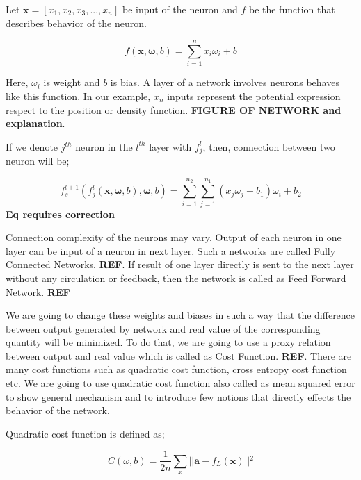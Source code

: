 \documentclass[a4paper,times,12pt]{article}
\begin{document}
Let $\boldsymbol{x} = [x_1, x_2, x_3, ..., x_n]$ be input of the neuron and $f$ be the function that describes behavior of the neuron. 

\begin{equation}
\label{eq:NU_neuron}
f(\boldsymbol{x}, \boldsymbol{\omega}, b) = \sum\limits_{i = 1}^n x_i\omega_i + b
\end{equation}

Here, $\omega_i$ is weight and $b$ is bias. A layer of a network involves neurons behaves like this function. In our example, $x_n$ inputs represent the potential expression respect to the position or density function. \textbf{FIGURE OF NETWORK and explanation}. 

If we denote $j^{th}$ neuron in the $l^{th}$ layer with $f_j^l$, then, connection between two neuron will be;

\begin{equation}
\label{eq:NU_neuron_connection}
f_s^{l+1}(f_j^{l}(\boldsymbol{x}, \boldsymbol{\omega}, b), \boldsymbol{\omega}, b) = \sum\limits_{i=1}^{n_2} \sum\limits_{j=1}^{n_1} (x_j\omega_j + b_1)\omega_i + b_2
\end{equation}
\textbf{Eq requires correction}

Connection complexity of the neurons may vary. Output of each neuron in one layer can be input of a neuron in next layer. Such a networks are called Fully Connected Networks. \textbf{REF}. If result of one layer directly is sent to the next layer without any circulation or feedback, then the network is called as Feed Forward Network. \textbf{REF}

We are going to change these weights and biases in such a way that the difference between output generated by network and real value of the corresponding quantity will be minimized. To do that, we are going to use a proxy relation between output and real value which is called as Cost Function. \textbf{REF}. There are many cost functions such as quadratic cost function, cross entropy cost function etc. We are going to use quadratic cost function also called as mean squared error to show general mechanism and to introduce few notions that directly effects the behavior of the network. 

Quadratic cost function is defined as;

\begin{equation}
\label{eq:NT_Quadratic}
C(\omega, b) = \frac{1}{2n} \sum\limits_{x} || \boldsymbol{a} - f_L(\boldsymbol{x}) ||{^2} 
\end{equation}
\end{document}
